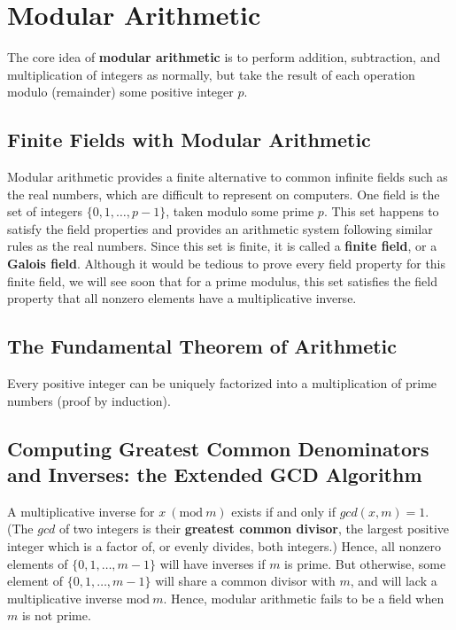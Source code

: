 \documentclass[12pt]{article}
\begin{document}
\section{Modular Arithmetic}

The core idea of \textbf{modular arithmetic} is to perform addition, subtraction, and multiplication of integers as normally, but take the result of each operation modulo (remainder) some positive integer $p$.

\subsection{Finite Fields with Modular Arithmetic}

Modular arithmetic provides a finite alternative to common infinite fields such as the real numbers, which are difficult to represent on computers. One field is the set of integers $\{ 0, 1, \ldots, p - 1 \}$, taken modulo some prime $p$. This set happens to satisfy the field properties and provides an arithmetic system following similar rules as the real numbers. Since this set is finite, it is called a \textbf{finite field}, or a \textbf{Galois field}. Although it would be tedious to prove every field property for this finite field, we will see soon that for a prime modulus, this set satisfies the field property that all nonzero elements have a multiplicative inverse.

\subsection{The Fundamental Theorem of Arithmetic}

Every positive integer can be uniquely factorized into a multiplication of prime numbers (proof by induction).

\subsection{Computing Greatest Common Denominators and Inverses: the Extended GCD Algorithm}

A multiplicative inverse for $x\ (\mathrm{mod}\ m)$ exists if and only if $gcd(x, m) = 1$. (The $gcd$ of two integers is their \textbf{greatest common divisor}, the largest positive integer which is a factor of, or evenly divides, both integers.) Hence, all nonzero elements of $\{ 0, 1, \ldots, m - 1 \}$ will have inverses if $m$ is prime. But otherwise, some element of $\{ 0, 1, \ldots, m - 1 \}$ will share a common divisor with $m$, and will lack a multiplicative inverse $\mathrm{mod}\ m$. Hence, modular arithmetic fails to be a field when $m$ is not prime.
\end{document}
